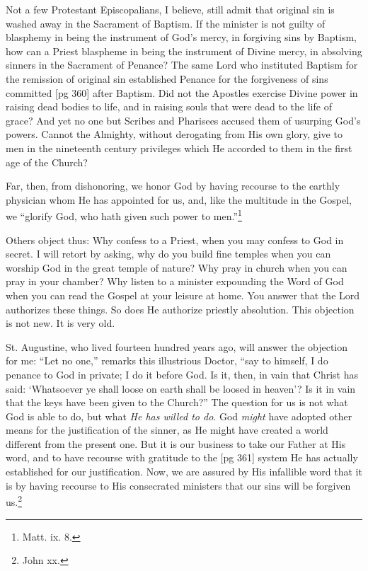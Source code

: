 Not a few Protestant Episcopalians, I believe,
still admit that original sin is washed away in the
Sacrament of Baptism. If the minister is not
guilty of blasphemy in being the instrument of
God's mercy, in forgiving sins by Baptism, how
can a Priest blaspheme in being the instrument of
Divine mercy, in absolving sinners in the Sacrament
of Penance? The same Lord who instituted
Baptism for the remission of original sin established
Penance for the forgiveness of sins committed
[pg 360]
after Baptism. Did not the Apostles exercise
Divine power in raising dead bodies to life,
and in raising souls that were dead to the life of
grace? And yet no one but Scribes and Pharisees
accused them of usurping God's powers. Cannot
the Almighty, without derogating from His own
glory, give to men in the nineteenth century privileges
which He accorded to them in the first age
of the Church?

Far, then, from dishonoring, we honor God by
having recourse to the earthly physician whom
He has appointed for us, and, like the multitude
in the Gospel, we “glorify God, who hath given
such power to men.”\footnote{Matt. ix. 8.}

Others object thus: Why confess to a Priest, when
you may confess to God in secret. I will retort by
asking, why do you build fine temples when you can
worship God in the great temple of nature? Why
pray in church when you can pray in your chamber?
Why listen to a minister expounding the
Word of God when you can read the Gospel at your
leisure at home. You answer that the Lord authorizes
these things. So does He authorize priestly
absolution. This objection is not new. It is very old.

St. Augustine, who lived fourteen hundred years
ago, will answer the objection for me: “Let no one,”
remarks this illustrious Doctor, “say to himself,
I do penance to God in private; I do it before God.
Is it, then, in vain that Christ has said: ‘Whatsoever
ye shall loose on earth shall be loosed in
heaven’? Is it in vain that the keys have been
given to the Church?” The question for us is not
what God is able to do, but what \emph{He has willed to
do}. God \emph{might} have adopted other means for the
justification of the sinner, as He might have
created a world different from the present one.
But it is our business to take our Father at His
word, and to have recourse with gratitude to the
[pg 361]
system He has actually established for our justification.
Now, we are assured by His infallible
word that it is by having recourse to His consecrated
ministers that our sins will be forgiven us.\footnote{John xx.}

